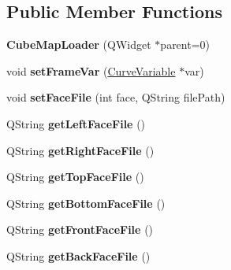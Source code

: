 \subsection*{\-Public \-Member \-Functions}
\begin{DoxyCompactItemize}
\item 
\hypertarget{class_cube_map_loader_afbee03579f70b3a8729bd88fe9d1e8fa}{
{\bfseries \-Cube\-Map\-Loader} (\-Q\-Widget $\ast$parent=0)}
\label{class_cube_map_loader_afbee03579f70b3a8729bd88fe9d1e8fa}

\item 
\hypertarget{class_cube_map_loader_aa51d95c4a30513668be4956252db5db7}{
void {\bfseries set\-Frame\-Var} (\hyperlink{class_curve_variable}{\-Curve\-Variable} $\ast$var)}
\label{class_cube_map_loader_aa51d95c4a30513668be4956252db5db7}

\item 
\hypertarget{class_cube_map_loader_a0b90aae1640b813bd5f17609ddf2171a}{
void {\bfseries set\-Face\-File} (int face, \-Q\-String file\-Path)}
\label{class_cube_map_loader_a0b90aae1640b813bd5f17609ddf2171a}

\item 
\hypertarget{class_cube_map_loader_af9694e673f0dcf17d3879459465ddf0a}{
\-Q\-String {\bfseries get\-Left\-Face\-File} ()}
\label{class_cube_map_loader_af9694e673f0dcf17d3879459465ddf0a}

\item 
\hypertarget{class_cube_map_loader_a7601219a63407961f67b70db70cd1dab}{
\-Q\-String {\bfseries get\-Right\-Face\-File} ()}
\label{class_cube_map_loader_a7601219a63407961f67b70db70cd1dab}

\item 
\hypertarget{class_cube_map_loader_a57fcf45e7111fb3ae5501007cb240208}{
\-Q\-String {\bfseries get\-Top\-Face\-File} ()}
\label{class_cube_map_loader_a57fcf45e7111fb3ae5501007cb240208}

\item 
\hypertarget{class_cube_map_loader_a53907c56132043876c188f5a84a8d13b}{
\-Q\-String {\bfseries get\-Bottom\-Face\-File} ()}
\label{class_cube_map_loader_a53907c56132043876c188f5a84a8d13b}

\item 
\hypertarget{class_cube_map_loader_a50185bdc428a752134cedf02adf339ad}{
\-Q\-String {\bfseries get\-Front\-Face\-File} ()}
\label{class_cube_map_loader_a50185bdc428a752134cedf02adf339ad}

\item 
\hypertarget{class_cube_map_loader_acb0485db2b110718edb414feeb213bcb}{
\-Q\-String {\bfseries get\-Back\-Face\-File} ()}
\label{class_cube_map_loader_acb0485db2b110718edb414feeb213bcb}

\end{DoxyCompactItemize}
